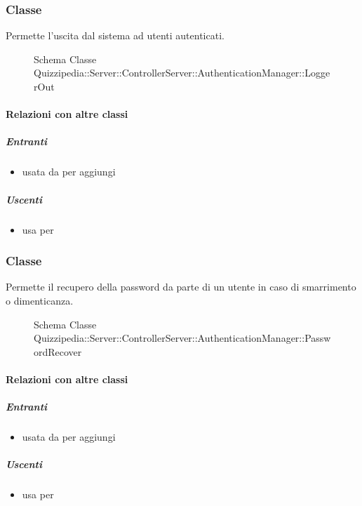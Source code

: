 \subsubsection{Classe }
Permette l'uscita dal sistema ad utenti autenticati.
\begin{figure}[H]
\centering
\noindent{}
\caption[Schema Classe LoggerOut]{Schema Classe Quizzipedia::Server::ControllerServer::AuthenticationManager::LoggerOut}
\end{figure}
\paragraph{Relazioni con altre classi}
\subparagraph{Entranti}
\begin{itemize}
\item usata da  per aggiungi
\end{itemize}
\subparagraph{Uscenti}
\begin{itemize}
\item usa  per 
\end{itemize}
\subsubsection{Classe }
Permette il recupero della password da parte di un utente in caso di smarrimento o dimenticanza.
\begin{figure}[H]
\centering
\noindent{}
\caption[Schema Classe PasswordRecover]{Schema Classe Quizzipedia::Server::ControllerServer::AuthenticationManager::PasswordRecover}
\end{figure}
\paragraph{Relazioni con altre classi}
\subparagraph{Entranti}
\begin{itemize}
\item usata da  per aggiungi
\end{itemize}
\subparagraph{Uscenti}
\begin{itemize}
\item usa  per 
\end{itemize}
